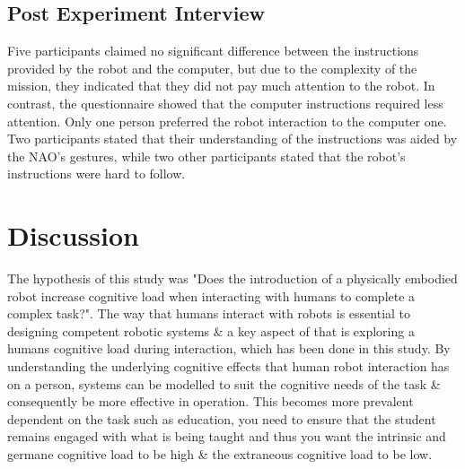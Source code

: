 \documentclass[conference]{IEEEtran}
\begin{document}
\subsection{Post Experiment Interview}
Five participants claimed no significant difference between the instructions provided by the robot and the computer, but due to the complexity of the mission, they indicated that they did not pay much attention to the robot. In contrast, the questionnaire showed that the computer instructions required less attention. Only one person preferred the robot interaction to the computer one. Two participants stated that their understanding of the instructions was aided by the NAO’s gestures, while two other participants stated that the robot's instructions were hard to follow. 


\section{Discussion}

 The hypothesis of this study was "Does the introduction of a physically embodied robot increase cognitive load when interacting with humans to complete a complex task?". The way that humans interact with robots is essential to designing competent robotic systems \& a key aspect of that is exploring a humans cognitive load during interaction, which has been done in this study. By understanding the underlying cognitive effects that human robot interaction has on a person, systems can be modelled to suit the cognitive needs of the task \& consequently be more effective in operation. This becomes more prevalent dependent on the task such as education, you need to ensure that the student remains engaged with what is being taught and thus you want the intrinsic and germane cognitive load to be high \& the extraneous cognitive load to be low.\newline
 
\end{document}
